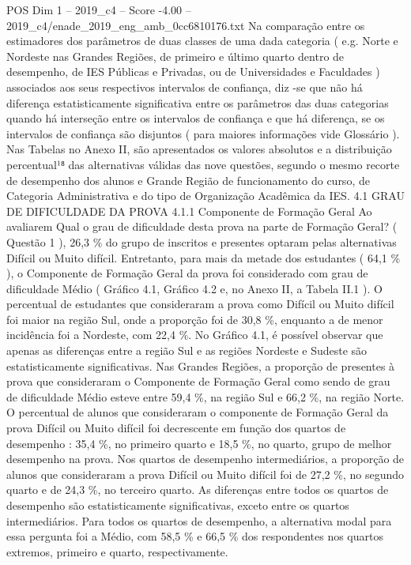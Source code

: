 \begin{textsample}{POS Dim 1 – 2019\_c4 – Score -4.00 – 2019\_c4/enade\_2019\_eng\_amb\_0cc6810176.txt}
Na comparação entre os estimadores dos parâmetros de duas classes de uma dada categoria ( e.g.
Norte e Nordeste nas Grandes Regiões, de primeiro e último quarto dentro de desempenho, de IES Públicas e Privadas, ou de Universidades e Faculdades ) associados aos seus respectivos intervalos de confiança, diz -se que não há diferença estatisticamente significativa entre os parâmetros das duas categorias quando há interseção entre os intervalos de confiança e que há diferença, se os intervalos de confiança são disjuntos ( para maiores informações vide Glossário ).
Nas Tabelas no Anexo II, são apresentados os valores absolutos e a distribuição percentual¹⁸ das alternativas válidas das nove questões, segundo o mesmo recorte de desempenho dos alunos e Grande Região de funcionamento do curso, de Categoria Administrativa e do tipo de Organização Acadêmica da IES. 4.1 GRAU DE DIFICULDADE DA PROVA 4.1.1 Componente de Formação Geral Ao avaliarem Qual o grau de dificuldade desta prova na parte de Formação Geral? ( Questão 1 ), 26,3 \% do grupo de inscritos e presentes optaram pelas alternativas Difícil ou Muito difícil.
Entretanto, para mais da metade dos estudantes ( 64,1 \% ), o Componente de Formação Geral da prova foi considerado com grau de dificuldade Médio ( Gráfico 4.1, Gráfico 4.2 e, no Anexo II, a Tabela II.1 ).
O percentual de estudantes que consideraram a prova como Difícil ou Muito difícil foi maior na região Sul, onde a proporção foi de 30,8 \%, enquanto a de menor incidência foi a Nordeste, com 22,4 \%.
No Gráfico 4.1, é possível observar que apenas as diferenças entre a região Sul e as regiões Nordeste e Sudeste são estatisticamente significativas.
Nas Grandes Regiões, a proporção de presentes à prova que consideraram o Componente de Formação Geral como sendo de grau de dificuldade Médio esteve entre 59,4 \%, na região Sul e 66,2 \%, na região Norte.
O percentual de alunos que consideraram o componente de Formação Geral da prova Difícil ou Muito difícil foi decrescente em função dos quartos de desempenho : 35,4 \%, no primeiro quarto e 18,5 \%, no quarto, grupo de melhor desempenho na prova.
Nos quartos de desempenho intermediários, a proporção de alunos que consideraram a prova Difícil ou Muito difícil foi de 27,2 \%, no segundo quarto e de 24,3 \%, no terceiro quarto.
As diferenças entre todos os quartos de desempenho são estatisticamente significativas, exceto entre os quartos intermediários.
Para todos os quartos de desempenho, a alternativa modal para essa pergunta foi a Médio, com 58,5 \% e 66,5 \% dos respondentes nos quartos extremos, primeiro e quarto, respectivamente.

\end{textsample}
